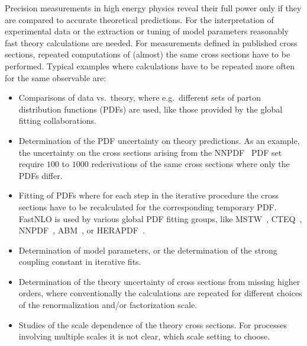 \documentclass{DISproc}
\begin{document}
Precision measurements in high energy physics reveal their full power
only if they are compared to accurate theoretical predictions.
For the interpretation of experimental data or the extraction or tuning of
model parameters reasonably fast theory calculations are needed.  For
measurements defined in published cross sections, repeated
computations of (almost) the same cross sections have to be performed.
Typical examples where calculations have to be repeated more often for
the same observable are:
\begin{itemize}
\item Comparisons of data vs.\ theory, where e.g.\
  different sets of parton distribution functions (PDFs) are used,
  like those provided by the global fitting collaborations.
\item Determination of the PDF uncertainty on theory predictions.  As
  an example, the uncertainty on the cross sections arising from the
  NNPDF~\cite{Ball:2011mu} PDF set require $100$ to $1000$
  rederivations of the same cross sections where only the PDFs
  differ.
\item Fitting of PDFs where for each step in the iterative procedure
  the cross sections have to be recalculated for the corresponding
  temporary PDF.  FastNLO is used by various global PDF fitting
  groups, like MSTW~\cite{Martin:2009iq}, CTEQ~\cite{Lai:2010vv},
  NNPDF~\cite{Ball:2011mu}, ABM~\cite{Alekhin:2012ig}, or
  HERAPDF~\cite{Nowak:12}.
\item Determination of model parameters, or the determination of the
  strong coupling constant in iterative fits.
\item Determination of the theory uncertainty of cross sections from
  missing higher orders, where conventionally the calculations are
  repeated for different choices of the renormalization and/or
  factorization scale.
\item Studies of the scale dependence of the theory cross sections.
  For processes involving multiple scales it is not clear, which scale
  setting to choose.
\end{itemize}
\end{document}

